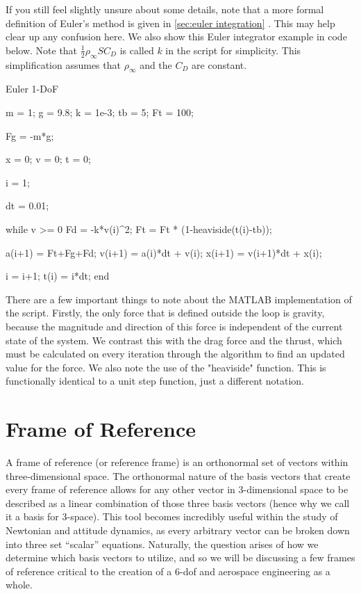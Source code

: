 \documentclass[10pt, openany, titlepage]{book}
\theoremstyle{definition}
\newcounter{example}[chapter]
\let\oldautoref\autoref
\renewcommand{\autoref}[1]{%
  \begingroup
  \hypersetup{linkcolor=black}%
  \oldautoref{#1}%
  \endgroup
}
\begin{document}
If you still feel slightly unsure about some details, note that a more formal definition of Euler’s method is given in \autoref{sec:euler integration}. This may help clear up any confusion here. We also show this Euler integrator example in code below. Note that $\frac{1}{2}\rho_{\infty}SC_D$ is called $k$ in the script for simplicity. This simplification assumes that $\rho_{\infty}$ and the $C_D$ are constant.

\newpage
\begin{matlabscript}{Euler 1-DoF}

m = 1;    %
g = 9.8;  %
k = 1e-3; %
tb = 5;   %
Ft = 100; %

Fg = -m*g;

x = 0; v = 0;
t = 0;

i = 1;

dt = 0.01; 

while v >= 0
    Fd = -k*v(i)^2;
    Ft = Ft * (1-heaviside(t(i)-tb));

    a(i+1) = Ft+Fg+Fd;
    v(i+1) = a(i)*dt + v(i);
    x(i+1) = v(i+1)*dt + x(i);

    i = i+1;
    t(i) = i*dt;
end
\end{matlabscript}

There are a few important things to note about the MATLAB implementation of the script. Firstly, the only force that is defined outside the loop is gravity, because the magnitude and direction of this force is independent of the current state of the system. We contrast this with the drag force and the thrust, which must be calculated on every iteration through the algorithm to find an updated value for the force. We also note the use of the "heaviside" function. This is functionally identical to a unit step function, just a different notation.

\section{Frame of Reference}\label{sec:Frame of Reference}
A frame of reference (or reference frame) is an \gls{orthonormal} set of vectors within three-dimensional space. The \gls{orthonormal} nature of the basis vectors that create every frame of reference allows for any other vector in 3-dimensional space to be described as a linear combination of those three basis vectors (hence why we call it a basis for 3-space). This tool becomes incredibly useful within the study of Newtonian and attitude dynamics, as every arbitrary vector can be broken down into three set ``scalar'' equations. Naturally, the question arises of how we determine which basis vectors to utilize, and so we will be discussing a few frames of reference critical to the creation of a 6-\gls{dof} and aerospace engineering as a whole.
\end{document}
